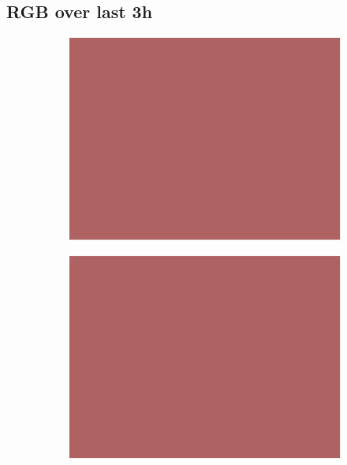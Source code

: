 \documentclass{article}
\begin{document}
\subsection*{RGB over last 3h}
\vspace{-1em}
\begin{figure}[H]
    \centering
    \begin{subfigure}[b]{0.32\textwidth}
        \centering
        \includegraphics[width=\linewidth]{rgb_184_h0.png} %
    \end{subfigure}
    \begin{subfigure}[b]{0.32\textwidth}
        \centering
        \includegraphics[width=\linewidth]{rgb_184_h1.png} %

\end{subfigure}
\end{figure}
\end{document}

